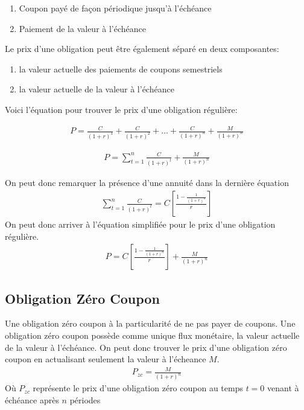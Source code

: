 \documentclass[letterpaper, 12pt]{article}
\newcommand{\1}{\mathds{1}}	%
\theoremstyle{definition}
\begin{document}
\begin{enumerate}
\item Coupon payé de façon périodique jusqu'à l'échéance
\item Paiement de la valeur à l'échéance
\end{enumerate}
\vspace{1cm}
Le prix d'une obligation peut être également séparé en deux composantes:

\begin{enumerate}
\item la valeur actuelle des paiements de coupons semestriels
\item la valeur actuelle de la valeur à l'échéance 
\end{enumerate}
\vspace{1cm}
Voici l'équation pour trouver le prix d'une obligation régulière:

\begin{align*}
P=\frac{C}{(1+r)^1}+\frac{C}{(1+r)^2}+...+\frac{C}{(1+r)^n}+\frac{M}{(1+r)^n}
\end{align*}

\begin{align*}
P=\sum_{t=1}^{n} \frac{C}{(1+r)^t}+\frac{M}{(1+r)^n}
\end{align*}

On peut donc remarquer la présence d'une annuité dans la dernière équation 
\begin{align*}
\sum_{t=1}^{n} \frac{C}{(1+r)^t}=C \left[ \frac{1-\frac{1}{(1+r)^n}}{r} \right]
\end{align*}
On peut donc arriver à l'équation simplifiée pour le prix d'une obligation régulière.
\begin{align*}
P=C \left[ \frac{1-\frac{1}{(1+r)^n}}{r} \right]+\frac{M}{(1+r)^n}
\end{align*}
\subsection{Obligation Zéro Coupon}
Une obligation zéro coupon à la particularité de ne pas payer de coupons. Une obligation zéro coupon possède comme unique flux monétaire, la valeur actuelle de la valeur à l'échéance. On peut donc trouver le prix d'une obligation zéro coupon en actualisant seulement la valeur à l'écheance $M$. 
\begin{align*}
P_{zc}=\frac{M}{(1+r)^n}
\end{align*}
Où $P_{zc}$ représente le prix d'une obligation zéro coupon au temps $t=0$ venant à échéance après $n$ périodes 
\end{document}
